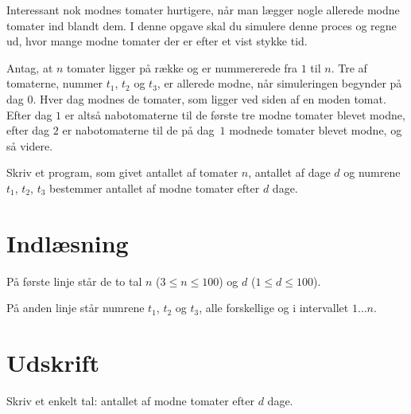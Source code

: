 
Interessant nok modnes tomater hurtigere, når man lægger nogle allerede modne tomater ind blandt dem.
I denne opgave skal du simulere denne proces og regne ud, hvor mange modne tomater der er efter et vist stykke tid.

Antag, at $n$ tomater ligger på række og er nummererede fra $1$ til $n$.
Tre af tomaterne, nummer $t_1$, $t_2$ og $t_3$, er allerede modne, når simuleringen begynder på dag $0$.
Hver dag modnes de tomater, som ligger ved siden af en moden tomat.
Efter dag $1$ er altså nabotomaterne til de første tre modne tomater blevet modne, efter dag $2$ er nabotomaterne til de på dag~$1$ modnede tomater blevet modne, og så videre.

Skriv et program, som givet antallet af tomater $n$, antallet af dage $d$ og numrene $t_1$, $t_2$, $t_3$ bestemmer antallet af modne tomater efter $d$ dage.

\section*{Indlæsning}

På første linje står de to tal $n$ ($3 \le n \le 100$) og $d$ ($1 \le d \le 100$).

På anden linje står numrene $t_1$, $t_2$ og $t_3$, alle forskellige og i intervallet $1 \dots n$.

\section*{Udskrift}
Skriv et enkelt tal: antallet af modne tomater efter $d$ dage.
